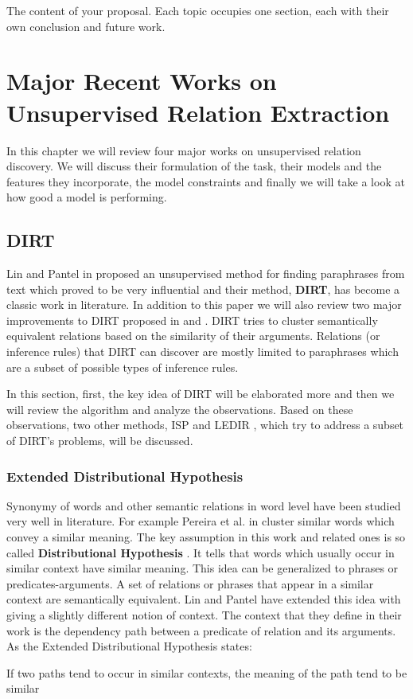 \documentclass[12pt]{report}
\begin{document}
The content of \cite{Huang2012} your proposal. Each topic occupies one section, each
with their own conclusion and future work.

\chapter{Major Recent Works on Unsupervised Relation Extraction}
\label{ch:related}


In this chapter we will review four major works on unsupervised relation
discovery.
 We will discuss their formulation of the task, their models
 and the features they incorporate, the model constraints and finally we will take a look at how good a model is performing.


\section{DIRT}
\label{ch:unsupervised}

Lin and Pantel in \cite{Lin2001} proposed an unsupervised method for finding paraphrases from text which  
proved to be very influential and their method, \textbf{DIRT}, has become a classic work in literature.
 In addition
 to this paper we will also review two major improvements to DIRT proposed in \cite{Bhagat2007} and \cite{Pantel2007}.
DIRT tries to cluster semantically equivalent relations based on the similarity of their arguments. Relations
(or inference rules) that DIRT can discover are mostly limited to paraphrases which are a subset of possible types of inference rules.

In this section, first, the key idea of DIRT will be elaborated more and then we will review the algorithm and analyze the observations.
Based on these observations, two other methods, ISP \cite{Pantel2007} and LEDIR \cite{Bhagat2007}, 
which try to address a subset of DIRT's problems, will be discussed.

\subsection{Extended Distributional Hypothesis}
\label{ch:assumption}

Synonymy of words and other semantic relations in word level have been studied very well in literature.
For example Pereira et al. in \cite{Pereira1993} 
cluster similar words which convey a similar meaning. The key assumption in this work and related ones is so called
 \textbf{Distributional Hypothesis} \cite{Harris1981}
 . It tells that words which usually occur in similar context have similar meaning. This idea can be generalized
  to phrases or predicates-arguments. A set of relations or phrases that appear in a similar context
  are semantically equivalent. Lin and Pantel have extended this idea with giving a slightly different notion
   of context. The context that they define in their work is the dependency path between a predicate of
    relation and its arguments. As the Extended Distributional Hypothesis states:
    \begin{shaded}
     If two paths tend to occur in similar contexts, the meaning of the path tend to be similar 
    \end{shaded}
    
\end{document}
